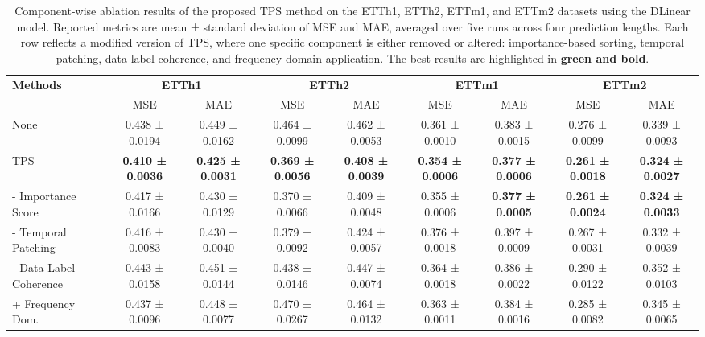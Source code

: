 \begin{table}[h!]
\centering
\vspace{0.2cm}
\renewcommand{\arraystretch}{1.8}
\begin{adjustbox}{max width=\textwidth}
\begin{tabular}{l|cc|cc|cc|cc}
    \toprule
    \textbf{Methods} & \multicolumn{2}{c|}{\textbf{ETTh1}} & \multicolumn{2}{c|}{\textbf{ETTh2}} & \multicolumn{2}{c|}{\textbf{ETTm1}} & \multicolumn{2}{c}{\textbf{ETTm2}} \\
    & MSE & MAE & MSE & MAE & MSE & MAE & MSE & MAE \\
    \midrule
    None & 0.438 ± 0.0194 & 0.449 ± 0.0162 & 0.464 ± 0.0099 & 0.462 ± 0.0053 & 0.361 ± 0.0010 & 0.383 ± 0.0015 & 0.276 ± 0.0099 & 0.339 ± 0.0093 \\

    TPS & \cellcolor{bestcolor} \textbf{0.410 ± 0.0036} & \cellcolor{bestcolor} \textbf{0.425 ± 0.0031} & \cellcolor{bestcolor} \textbf{0.369 ± 0.0056} & 
 \cellcolor{bestcolor} \textbf{0.408 ± 0.0039} & \cellcolor{bestcolor} \textbf{0.354 ± 0.0006} & \cellcolor{bestcolor} \textbf{0.377 ± 0.0006} & \cellcolor{bestcolor} \textbf{0.261 ± 0.0018} & \cellcolor{bestcolor} \textbf{0.324 ± 0.0027} \\
    \hspace{0.5em}- Importance Score & 0.417 ± 0.0166 & 0.430 ± 0.0129 & 0.370 ± 0.0066 & 0.409 ± 0.0048 & 0.355 ± 0.0006 & \cellcolor{bestcolor}\textbf{0.377 ± 0.0005} & \cellcolor{bestcolor}\textbf{0.261 ± 0.0024} & \cellcolor{bestcolor}\textbf{0.324 ± 0.0033} \\
    \hspace{0.5em}- Temporal Patching & 0.416 ± 0.0083 & 0.430 ± 0.0040 & 0.379 ± 0.0092 & 0.424 ± 0.0057 & 0.376 ± 0.0018 & 0.397 ± 0.0009 & 0.267 ± 0.0031 & 0.332 ± 0.0039 \\
    \hspace{0.5em}- Data-Label Coherence & 0.443 ± 0.0158 & 0.451 ± 0.0144 & 0.438 ± 0.0146 & 0.447 ± 0.0074 & 0.364 ± 0.0018 & 0.386 ± 0.0022 & 0.290 ± 0.0122 & 0.352 ± 0.0103 \\
    \hspace{0.5em}+ Frequency Dom. & 0.437 ± 0.0096 & 0.448 ± 0.0077 & 0.470 ± 0.0267 & 0.464 ± 0.0132 & 0.363 ± 0.0011 & 0.384 ± 0.0016 & 0.285 ± 0.0082 & 0.345 ± 0.0065 \\
    \bottomrule
\end{tabular}
\end{adjustbox}
\caption{Component-wise ablation results of the proposed TPS method on the ETTh1, ETTh2, ETTm1, and ETTm2 datasets using the DLinear model. Reported metrics are mean ± standard deviation of MSE and MAE, averaged over five runs across four prediction lengths. Each row reflects a modified version of TPS, where one specific component is either removed or altered: importance-based sorting, temporal patching, data-label coherence, and frequency-domain application. The best results are highlighted in \textbf{green and bold}.}
\label{tab:ablation_dlinear}
\end{table}


